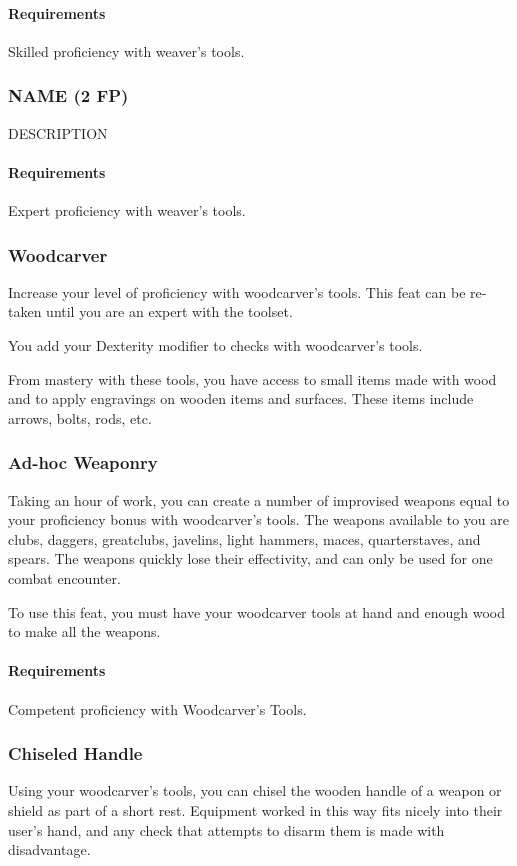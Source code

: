     \paragraph{Requirements} Skilled proficiency with weaver's tools.
\subsubsection{NAME (2 FP)} \label{feat::name}
    DESCRIPTION
    \paragraph{Requirements} Expert proficiency with weaver's tools.

\subsubsection{Woodcarver} \label{feat::woodcarver}
    Increase your level of proficiency with woodcarver's tools.
    This feat can be re-taken until you are an expert with the toolset.

    You add your Dexterity modifier to checks with woodcarver's tools.

    From mastery with these tools, you have access to small items made with wood and to apply engravings on wooden items and surfaces.
    These items include arrows, bolts, rods, etc.
\subsubsection{Ad-hoc Weaponry} \label{feat::adhocweaponry}
    Taking an hour of work, you can create a number of improvised weapons equal to your proficiency bonus with woodcarver's tools.
    The weapons available to you are clubs, daggers, greatclubs, javelins, light hammers, maces, quarterstaves, and spears.
    The weapons quickly lose their effectivity, and can only be used for one combat encounter.

    To use this feat, you must have your woodcarver tools at hand and enough wood to make all the weapons.
    \paragraph{Requirements} Competent proficiency with Woodcarver's Tools.
\subsubsection{Chiseled Handle} \label{feat::chiseledhandle}
    Using your woodcarver's tools, you can chisel the wooden handle of a weapon or shield as part of a short rest.
    Equipment worked in this way fits nicely into their user's hand, and any check that attempts to disarm them is made with disadvantage.

